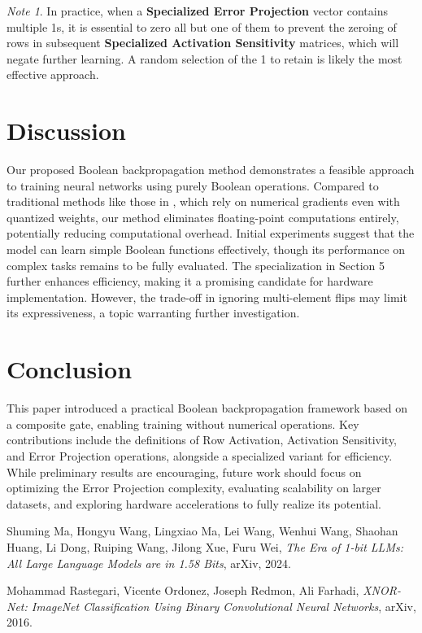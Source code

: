 \documentclass{article}
\theoremstyle{definition}
\theoremstyle{remark}
\newtheorem*{note}{Note}
\begin{document}
\begin{note}
    In practice, when a \textbf{Specialized Error Projection} vector contains multiple 1s, it is essential to zero all but one of them to prevent the zeroing of rows in subsequent \textbf{Specialized Activation Sensitivity} matrices, which will negate further learning. A random selection of the 1 to retain is likely the most effective approach.
\end{note}

\section{Discussion}
Our proposed Boolean backpropagation method demonstrates a feasible approach to training neural networks using purely Boolean operations. Compared to traditional methods like those in \cite{rastegari2016}, which rely on numerical gradients even with quantized weights, our method eliminates floating-point computations entirely, potentially reducing computational overhead. Initial experiments suggest that the model can learn simple Boolean functions effectively, though its performance on complex tasks remains to be fully evaluated. The specialization in Section 5 further enhances efficiency, making it a promising candidate for hardware implementation. However, the trade-off in ignoring multi-element flips may limit its expressiveness, a topic warranting further investigation.

\section{Conclusion}
This paper introduced a practical Boolean backpropagation framework based on a composite gate, enabling training without numerical operations. Key contributions include the definitions of Row Activation, Activation Sensitivity, and Error Projection operations, alongside a specialized variant for efficiency. While preliminary results are encouraging, future work should focus on optimizing the Error Projection complexity, evaluating scalability on larger datasets, and exploring hardware accelerations to fully realize its potential.

\begin{thebibliography}{9}
    Shuming Ma, Hongyu Wang, Lingxiao Ma, Lei Wang, Wenhui Wang, Shaohan Huang, Li Dong, Ruiping Wang, Jilong Xue, Furu Wei, \textit{The Era of 1-bit LLMs: All Large Language Models are in 1.58 Bits}, arXiv, 2024.

    Mohammad Rastegari, Vicente Ordonez, Joseph Redmon, Ali Farhadi, \textit{XNOR-Net: ImageNet Classification Using Binary Convolutional Neural Networks}, arXiv, 2016.
\end{thebibliography}
\end{document}

